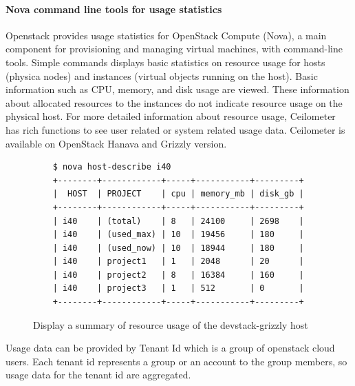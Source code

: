 \documentclass{sig-alternate-05-2015}
\begin{document}
\paragraph{Nova command line tools for usage statistics}

Openstack provides usage statistics for OpenStack Compute (Nova), a main component for provisioning and managing virtual machines, with command-line tools. Simple commands displays basic statistics on resource usage for hosts (physica nodes) and instances (virtual objects running on the host). Basic information such as CPU, memory, and disk usage are viewed. These information about allocated resources to the instances do not indicate resource usage on the physical host. For more detailed information about resource usage, Ceilometer has rich functions to see user related or system related usage data. Ceilometer is available on OpenStack Hanava and Grizzly version. 

\begin{figure}[htb]
\begin{scriptsize}
\begin{verbatim}
    $ nova host-describe i40
    +--------+------------+-----+-----------+---------+
    |  HOST  | PROJECT    | cpu | memory_mb | disk_gb |
    +--------+------------+-----+-----------+---------+
    | i40    | (total)    | 8   | 24100     | 2698    |
    | i40    | (used_max) | 10  | 19456     | 180     |
    | i40    | (used_now) | 10  | 18944     | 180     |
    | i40    | project1   | 1   | 2048      | 20      |
    | i40    | project2   | 8   | 16384     | 160     |
    | i40    | project3   | 1   | 512       | 0       |
    +--------+------------+-----+-----------+---------+
\end{verbatim}
\vspace{-20pt}
\end{scriptsize}

\caption{Display a summary of resource usage of the devstack-grizzly host}
\label{F:host-describe}

\end{figure}

Usage data can be provided by Tenant Id which is a group of openstack cloud users. Each tenant id represents a group or an account to the group members, so usage data for the tenant id are aggregated. 
\end{document}
